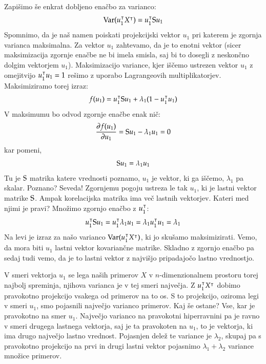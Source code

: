 Zapišimo še enkrat dobljeno enačbo za varianco:
\begin{equation}
  \mathrm{Var}(u_1^\intercal X^\intercal) = u_1^\intercal {\rm S} u_1
\end{equation}
%
Spomnimo, da je naš namen poiskati projekcijski vektor $u_1$ pri katerem je zgornja varianca maksimalna. Za vektor $u_1$ zahtevamo, da je to enotni vektor (sicer maksimizacija zgornje enačbe ne bi imela smisla, saj bi to dosegli z neskončno dolgim vektorjem $u_1$). Maksimizacijo variance, kjer iščemo ustrezen vektor $u_1$ z omejitvijo $u_1^\intercal u_1=1$ rešimo z uporabo Lagrangeovih multiplikatorjev. Maksimiziramo torej izraz:
%
\begin{equation}
  f(u_1) = u_1^\intercal {\rm S} u_1 + \lambda_1(1-u_1^\intercal u_1)
\end{equation}
%
V maksimumu bo odvod zgornje enačbe enak nič:
\begin{equation}
  \frac{\partial f(u_1)}{\partial u_1}={\rm S} u_1 - \lambda_1 u_1=0
\end{equation}
%
kar pomeni,
\begin{equation}
  {\rm S} u_1=\lambda_1 u_1
\end{equation}
%
Tu je ${\rm S}$ matrika katere vrednosti poznamo, $u_1$ je vektor, ki ga iščemo, $\lambda_1$ pa skalar. Poznano? Seveda! Zgornjemu pogoju ustreza le tak $u_1$, ki je lastni vektor matrike ${\rm S}$. Ampak korelacijska matrika ima več lastnih vektorjev. Kateri med njimi je pravi? Množimo zgornjo enačbo z $u_1^\intercal$:
%
\begin{equation}
  u_1^\intercal {\rm S} u_1 = u_1^\intercal \lambda_1 u_1=\lambda_1 u_1^\intercal u_1=\lambda_1
\end{equation}
%
Na levi je izraz za našo varianco $\mathrm{Var}(u_1^\intercal X^\intercal)$, ki jo skušamo maksimizirati. Vemo, da mora biti $u_1$ lastni vektor kovariančne matrike. Skladno z zgornjo enačbo pa sedaj tudi vemo, da je to lastni vektor z najvišjo pripadajočo lastno vrednostjo.

V smeri vektorja $u_1$ se lega naših primerov $X$ v $n$-dimenzionalnem prostoru torej najbolj spreminja, njihova varianca je v tej smeri največja. Z $u_1^\intercal X^\intercal$ dobimo pravokotno projekcijo vsakega od primerov na to os. S to projekcijo, oziroma legi v smeri $u_1$, smo pojasnili največjo varianco primerov. Kaj še ostane? Vse, kar je pravokotno na smer $u_1$. Največjo varianco na pravokotni hiperravnini pa je ravno v smeri drugega lastnega vektorja, saj je ta pravokoten na $u_1$, to je vektorja, ki ima drugo največjo lastno vrednost. Pojasnjen delež te variance je $\lambda_2$, skupaj pa s pravokotno projekcijo na prvi in drugi lastni vektor pojasnimo $\lambda_1+\lambda_2$ variance množice primerov.

